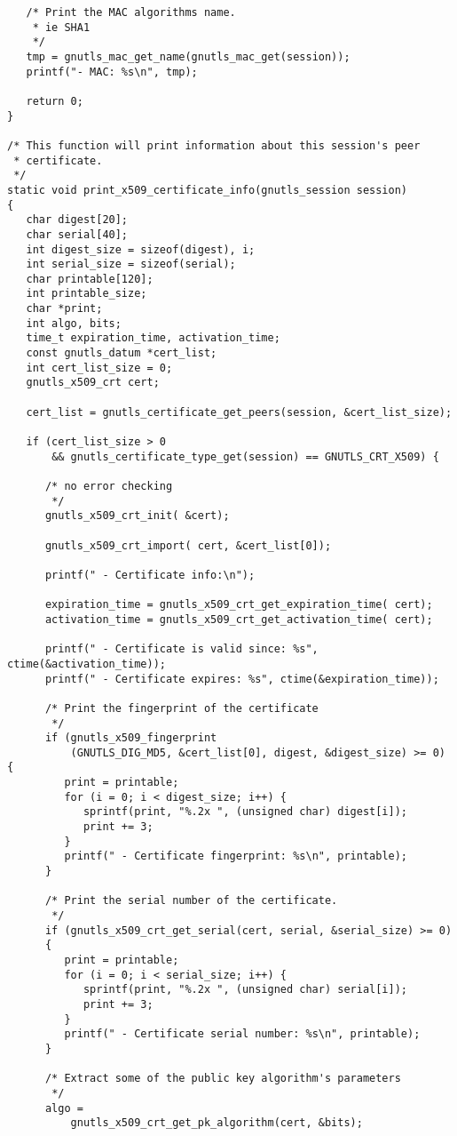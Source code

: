 \begin{verbatim}
   /* Print the MAC algorithms name.
    * ie SHA1
    */
   tmp = gnutls_mac_get_name(gnutls_mac_get(session));
   printf("- MAC: %s\n", tmp);

   return 0;
}

/* This function will print information about this session's peer
 * certificate. 
 */
static void print_x509_certificate_info(gnutls_session session)
{
   char digest[20];
   char serial[40];
   int digest_size = sizeof(digest), i;
   int serial_size = sizeof(serial);
   char printable[120];
   int printable_size;
   char *print;
   int algo, bits;
   time_t expiration_time, activation_time;
   const gnutls_datum *cert_list;
   int cert_list_size = 0;
   gnutls_x509_crt cert;

   cert_list = gnutls_certificate_get_peers(session, &cert_list_size);

   if (cert_list_size > 0
       && gnutls_certificate_type_get(session) == GNUTLS_CRT_X509) {

      /* no error checking
       */
      gnutls_x509_crt_init( &cert);

      gnutls_x509_crt_import( cert, &cert_list[0]);

      printf(" - Certificate info:\n");

      expiration_time = gnutls_x509_crt_get_expiration_time( cert);
      activation_time = gnutls_x509_crt_get_activation_time( cert);

      printf(" - Certificate is valid since: %s", ctime(&activation_time));
      printf(" - Certificate expires: %s", ctime(&expiration_time));

      /* Print the fingerprint of the certificate
       */
      if (gnutls_x509_fingerprint
          (GNUTLS_DIG_MD5, &cert_list[0], digest, &digest_size) >= 0) {
         print = printable;
         for (i = 0; i < digest_size; i++) {
            sprintf(print, "%.2x ", (unsigned char) digest[i]);
            print += 3;
         }
         printf(" - Certificate fingerprint: %s\n", printable);
      }

      /* Print the serial number of the certificate.
       */
      if (gnutls_x509_crt_get_serial(cert, serial, &serial_size) >= 0) 
      {
         print = printable;
         for (i = 0; i < serial_size; i++) {
            sprintf(print, "%.2x ", (unsigned char) serial[i]);
            print += 3;
         }
         printf(" - Certificate serial number: %s\n", printable);
      }

      /* Extract some of the public key algorithm's parameters
       */
      algo =
          gnutls_x509_crt_get_pk_algorithm(cert, &bits);


\end{verbatim}

